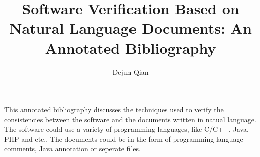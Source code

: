 \documentclass{acmtrans2m}
\title{Software Verification Based on Natural Language Documents: An Annotated Bibliography}
\author{Dejun Qian}
\begin{document}
\maketitle
\pagestyle{plain}

This annotated bibliography discusses the techniques used to verify the consistencies
between the software and the documents written in natual language. The software could
use a variety of programming languages, like C/C++, Java, PHP and etc.. The documents
could be in the form of programming language comments, Java annotation or seperate
files.

\nocite{*}



\end{document}

